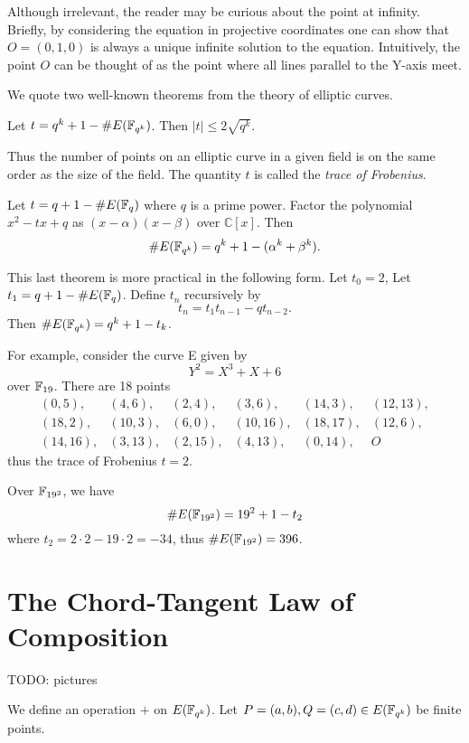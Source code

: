 Although irrelevant, the reader may be curious about the point at infinity.
Briefly, by considering the equation in
projective coordinates one can show that $O = (0,1,0)$ is always a unique
infinite solution to the equation. Intuitively,
the point $O$ can be thought of as the point where all lines
parallel to the Y-axis meet.

We quote two well-known theorems from the theory of elliptic curves.

\begin{theorem}
[Hasse] Let $t = q^k + 1 - \#E(\mathbb{F}_{q^k})$.
Then $|t| \le 2\sqrt{q^k}$.
\end{theorem}

Thus the number of points on an elliptic curve in a given field
is on the same order as the size of the field.
The quantity $t$ is called the \emph{trace of Frobenius}.

\begin{theorem}
[Weil] Let $t = q + 1 - \#E(\mathbb{F}_q)$
where $q$ is a prime power.
Factor the polynomial $x^2 - t x + q$ as $(x-\alpha)(x-\beta)$ over
$\mathbb{C}[x]$.
Then
\[ \#E(\mathbb{F}_{q^k}) = q^k + 1 - (\alpha^k + \beta^k) .\]
\end{theorem}

This last theorem is more practical in the following form. Let $t_0 = 2$,
Let $t_1 = q + 1 - \#E(\mathbb{F}_q)$.
Define $t_n$ recursively by
\[ t_n = t_1 t_{n-1} - q t_{n-2} .\]
Then $\#E(\mathbb{F}_{q^k}) = q^k + 1 - t_k$.

For example, consider the curve E\cite{bk} given by
\[ Y^2 = X^3 + X + 6 \]
over $\mathbb{F}_{19}$. There are 18 points
\[
\begin{array}{llllll}
(0,5), & (4,6), & (2,4), & (3,6), & (14,3), & (12,13), \\
(18,2), & (10,3), & (6,0), & (10,16), & (18, 17), & (12,6), \\
(14,16), & (3,13), & (2,15), & (4,13), & (0,14), & O
\end{array}
\]
thus the trace of Frobenius $t = 2$.

Over $\mathbb{F}_{{19}^2}$, we have
\[
\#E(\mathbb{F}_{{19}^2}) = 19^2 + 1 - t_2
\]
where $t_2 = 2\cdot 2 - 19 \cdot 2 = -34$, thus
$\#E(\mathbb{F}_{{19}^2}) = 396$.

\section {The Chord-Tangent Law of Composition}

TODO: pictures

We define an operation $+$ on $E(\mathbb{F}_{q^k})$.
Let $P = (a,b), Q = (c,d) \in E(\mathbb{F}_{q^k})$ be finite points.

